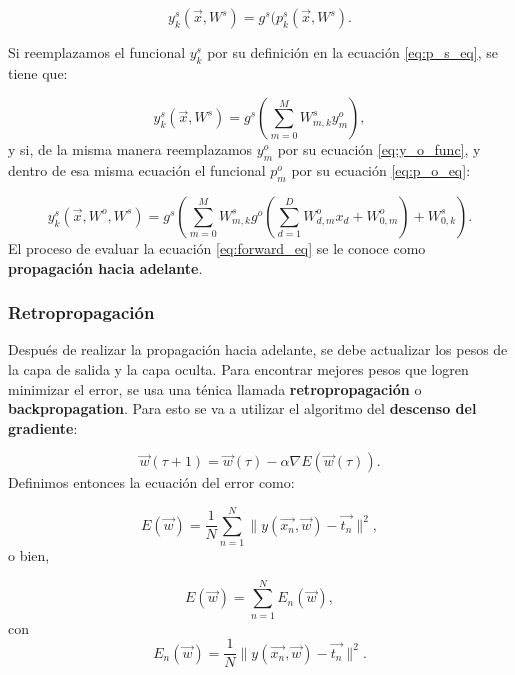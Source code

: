 \documentclass{article}
\begin{document}
\begin{equation}
    y_k^s(\vec{x}, W^s) = g^s(p_k^s(\vec{x}, W^s). \label{eq:y_s_eq}
\end{equation}

\noindent
Si reemplazamos el funcional $y_k^s$ por su definición en la ecuación \ref{eq:p_s_eq}, se tiene que:

\begin{equation}
    y_k^s(\vec{x}, W^s) = g^s\left(\sum_{m=0}^{M}{W_{m,k}^s y_m^o}\right),
\end{equation}
\noindent
y si, de la misma manera reemplazamos $y_m^o$ por su ecuación \ref{eq:y_o_func}, y dentro de esa misma ecuación el funcional $p_m^o$ por su ecuación \ref{eq:p_o_eq}:

\begin{equation}
    y_k^s(\vec{x}, W^o, W^s) = g^s\left( \sum_{m=0}^{M}{W_{m,k}^s g^{o} \left( \sum_{d=1}^{D}{W_{d,m}^{o} x_d + W_{0,m}^o}\right) } + W_{0,k}^s\right). \label{eq:forward_eq}
\end{equation}
\noindent
El proceso de evaluar la ecuación \ref{eq:forward_eq} se le conoce como \textbf{propagación hacia adelante}. \\

\subsubsection{Retropropagación} \label{sec:backpropagation_details}
Después de realizar la propagación hacia adelante, se debe actualizar los pesos de la capa de salida y la capa oculta. Para encontrar mejores pesos que logren minimizar el error, se usa una ténica llamada \textbf{retropropagación} o \textbf{backpropagation}. Para esto se va a utilizar el algoritmo del \textbf{descenso del gradiente}:

\begin{equation}
    \vec{w}(\tau+1) = \vec{w}(\tau) - \alpha\nabla E(\vec{w}(\tau)). \label{eq:grad_des}
\end{equation}
\noindent
Definimos entonces la ecuación del error como:

\begin{equation}
    E(\vec{w}) = \frac{1}{N}\sum_{n=1}^{N}\|y(\vec{x_n},\vec{w}) - \vec{t_n}\|^2, \label{eq:ew_error}
\end{equation}
\noindent
o bien, 

\begin{equation*}
    E(\vec{w}) = \sum_{n=1}^{N}{E_n(\vec{w})},
\end{equation*}
\noindent
con
\begin{equation*}
    E_n(\vec{w}) = \frac{1}{N}\|y(\vec{x_n}, \vec{w}) - \vec{t_n}\|^2.
\end{equation*}
\end{document}
